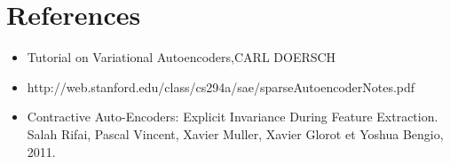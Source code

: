 \documentclass[xcolor=pdftex,dvipsnames,table,mathserif]{beamer}
\begin{document}
\section{References}
\begin{frame}
\begin{itemize}
\item Tutorial on Variational Autoencoders,CARL DOERSCH
\item http://web.stanford.edu/class/cs294a/sae/sparseAutoencoderNotes.pdf
\item Contractive Auto-Encoders: Explicit Invariance During Feature Extraction.
Salah Rifai, Pascal Vincent, Xavier Muller, Xavier Glorot et Yoshua Bengio, 2011.
\end{itemize}
\end{frame}


\end{document}
